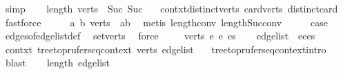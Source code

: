 \begin{isabellebody}
\ simp\isanewline
\ \ \isamarkupfalse%
\ {\isachardoublequoteopen}length\ verts\ {\isacharequal}{\kern0pt}\ Suc\ {\isacharparenleft}{\kern0pt}Suc\ {}{\isacharparenright}{\kern0pt}{\isachardoublequoteclose}\ \isamarkupfalse%
\ contxt{\isachardot}{\kern0pt}distinct{\isacharunderscore}{\kern0pt}verts\ card{\isacharunderscore}{\kern0pt}verts\ distinct{\isacharunderscore}{\kern0pt}card\ \isamarkupfalse%
\ fastforce\isanewline
\ \ \isamarkupfalse%
\ \isamarkupfalse%
\ {\isachardoublequoteopen}{\isasymexists}a\ b{\isachardot}{\kern0pt}\ verts\ {\isacharequal}{\kern0pt}\ {\isacharbrackleft}{\kern0pt}a{\isacharcomma}{\kern0pt}b{\isacharbrackright}{\kern0pt}{\isachardoublequoteclose}\ \isamarkupfalse%
\ {\isacharparenleft}{\kern0pt}metis\ length{\isacharunderscore}{\kern0pt}{}{\isacharunderscore}{\kern0pt}conv\ length{\isacharunderscore}{\kern0pt}Suc{\isacharunderscore}{\kern0pt}conv{\isacharparenright}{\kern0pt}\isanewline
\ \ \isamarkupfalse%
\ \isamarkupfalse%
\ {\isacharquery}{\kern0pt}case\ \isamarkupfalse%
\ edges{\isacharunderscore}{\kern0pt}of{\isacharunderscore}{\kern0pt}edge{\isacharunderscore}{\kern0pt}list{\isacharunderscore}{\kern0pt}def\ \isamarkupfalse%
\ set{\isacharunderscore}{\kern0pt}verts\ \isamarkupfalse%
\ force\isanewline
{}\isamarkupfalse%
\isanewline
\ \ \isamarkupfalse%
\ {\isacharparenleft}{\kern0pt}{}\ verts\ e{}\ e{}\ es{\isacharparenright}{\kern0pt}\isanewline
\ \ \isamarkupfalse%
\ {\isacharquery}{\kern0pt}edge{\isacharunderscore}{\kern0pt}list\ {\isacharequal}{\kern0pt}\ {\isachardoublequoteopen}e{}{\isacharhash}{\kern0pt}e{}{\isacharhash}{\kern0pt}es{\isachardoublequoteclose}\isanewline
\ \ \isamarkupfalse%
\ contxt{\isacharcolon}{\kern0pt}\ tree{\isacharunderscore}{\kern0pt}to{\isacharunderscore}{\kern0pt}prufer{\isacharunderscore}{\kern0pt}seq{\isacharunderscore}{\kern0pt}context\ verts\ {\isacharquery}{\kern0pt}edge{\isacharunderscore}{\kern0pt}list\ \isamarkupfalse%
\ {}\ tree{\isacharunderscore}{\kern0pt}to{\isacharunderscore}{\kern0pt}prufer{\isacharunderscore}{\kern0pt}seq{\isacharunderscore}{\kern0pt}context{\isachardot}{\kern0pt}intro\ \isamarkupfalse%
\ blast\isanewline
\ \ \isamarkupfalse%
\ {\isachardoublequoteopen}length\ {\isacharquery}{\kern0pt}edge{\isacharunderscore}{\kern0pt}list\ {\isasymge}\ {}{\isachardoublequoteclose}\ \isamarkupfalse%

\end{isabellebody}
